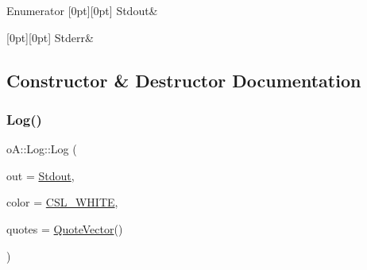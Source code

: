 \begin{DoxyEnumFields}{Enumerator}
[0pt][0pt]{}\mbox{\label{classo_a_1_1_log_a640171dc239ea7befcd640362343f88fa6504dea4a3bf34c8734b664b6364a0d9}} 
Stdout&\\
\hline

[0pt][0pt]{}\mbox{\label{classo_a_1_1_log_a640171dc239ea7befcd640362343f88faa01279ed925a2480f04ad2d89bf1722a}} 
Stderr&\\
\hline

\end{DoxyEnumFields}


\subsection{Constructor \& Destructor Documentation}
\mbox{\label{classo_a_1_1_log_a8f57798a38bc53782107ee07f2f2caa5}} 
\subsubsection{\texorpdfstring{Log()}{Log()}\hspace{0.1cm}{\footnotesize\ttfamily [1/2]}}
{\footnotesize\ttfamily o\+A\+::\+Log\+::\+Log (\begin{DoxyParamCaption}\item[{\mbox{\hyperlink{classo_a_1_1_log_a640171dc239ea7befcd640362343f88f}{Output}}}]{out = {\ttfamily \mbox{\hyperlink{classo_a_1_1_log_a640171dc239ea7befcd640362343f88fa6504dea4a3bf34c8734b664b6364a0d9}{Stdout}}},  }\item[{const \mbox{\hyperlink{namespaceo_a_a747e07c1977a29f3e1d38683043ec927}{Console\+Color}} \&}]{color = {\ttfamily \mbox{\hyperlink{namespaceo_a_a4afb55957ed6dcda70e81d6dd8f07885}{C\+S\+L\+\_\+\+W\+H\+I\+TE}}},  }\item[{const \mbox{\hyperlink{namespaceo_a_a38695044d9ec0b57190f4e3fab0caffd}{Quote\+Vector}} \&}]{quotes = {\ttfamily \mbox{\hyperlink{namespaceo_a_a38695044d9ec0b57190f4e3fab0caffd}{Quote\+Vector}}()} }\end{DoxyParamCaption})}



